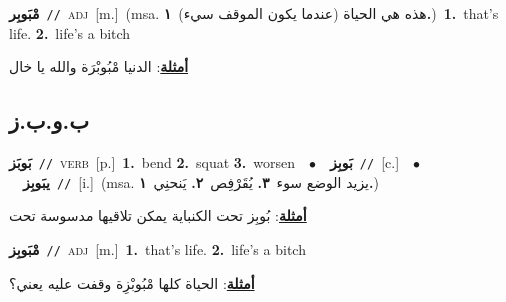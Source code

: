 \documentclass[10pt,a4paper,twoside]{article} %
\begin{document}
\begin{multicols}{2}
{\setlength\topsep{0pt}\textbf{\foreignlanguage{arabic}{مْبَوبِر}}\ {\color{gray}\texttt{//}\color{black}}\ \textsc{adj}\ [m.]\ \color{gray}(msa. \foreignlanguage{arabic}{هذه هي الحياة (عندما يكون الموقف سيء)}~\foreignlanguage{arabic}{\textbf{١.}})\color{black}\ \textbf{1.}~that's life.  \textbf{2.}~life's a bitch\  \begin{flushright}\color{gray}\foreignlanguage{arabic}{\textbf{\underline{\foreignlanguage{arabic}{أمثلة}}}: الدنيا مْبُوبْرَة والله يا خال}\end{flushright}\color{black}} \vspace{2mm}

\vspace{-3mm}
\subsection*{\color{blue}\foreignlanguage{arabic}{ب.و.ب.ز}\color{blue}{}} 

{\setlength\topsep{0pt}\textbf{\foreignlanguage{arabic}{بَوبَز}}\ {\color{gray}\texttt{//}\color{black}}\ \textsc{verb}\ [p.]\ \textbf{1.}~bend  \textbf{2.}~squat  \textbf{3.}~worsen\ \ $\bullet$\ \ \setlength\topsep{0pt}\textbf{\foreignlanguage{arabic}{بَوبِز}}\ {\color{gray}\texttt{//}\color{black}}\ [c.]\ \ $\bullet$\ \ \setlength\topsep{0pt}\textbf{\foreignlanguage{arabic}{يبَوبِز}}\ {\color{gray}\texttt{//}\color{black}}\ [i.]\ \color{gray}(msa. \foreignlanguage{arabic}{يزيد الوضع سوء}~\foreignlanguage{arabic}{\textbf{٣.}}  \foreignlanguage{arabic}{يُقَرْفِص}~\foreignlanguage{arabic}{\textbf{٢.}}  \foreignlanguage{arabic}{يَنحنِي}~\foreignlanguage{arabic}{\textbf{١.}})\color{black}\  \begin{flushright}\color{gray}\foreignlanguage{arabic}{\textbf{\underline{\foreignlanguage{arabic}{أمثلة}}}: بُوبِز تحت الكنباية يمكن تلاقيها مدسوسة تحت}\end{flushright}\color{black}} \vspace{2mm}

{\setlength\topsep{0pt}\textbf{\foreignlanguage{arabic}{مْبَوبِز}}\ {\color{gray}\texttt{//}\color{black}}\ \textsc{adj}\ [m.]\ \textbf{1.}~that's life.  \textbf{2.}~life's a bitch\  \begin{flushright}\color{gray}\foreignlanguage{arabic}{\textbf{\underline{\foreignlanguage{arabic}{أمثلة}}}: الحياة كلها مْبُوبْزِة وقفت عليه يعني؟}\end{flushright}\color{black}} \vspace{2mm}


\end{multicols}
\end{document}
